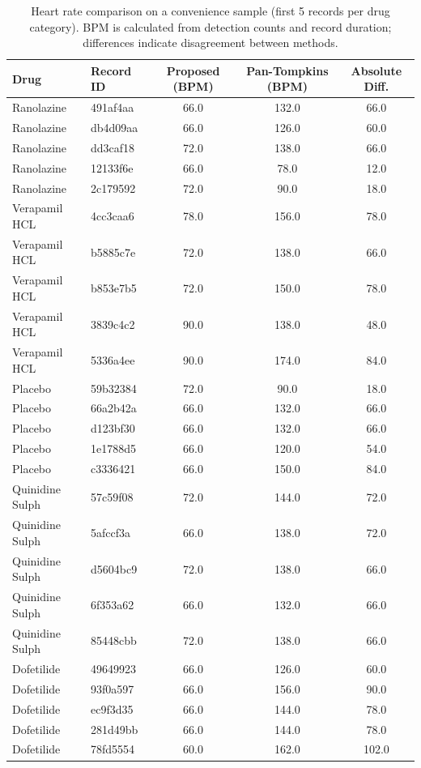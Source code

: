 \documentclass[11pt]{article}
\begin{document}
\begin{table}[htbp]
\centering
\small
\setlength{\tabcolsep}{3pt}
\caption{Heart rate comparison on a convenience sample (first 5 records per drug category). BPM is calculated from detection counts and record duration; differences indicate disagreement between methods.}
\label{tab:benchmark}
    \begin{tabular}{llccc}
        \toprule
        \textbf{Drug} & \textbf{Record ID} & \textbf{Proposed (BPM)} & \textbf{Pan-Tompkins (BPM)} & \textbf{Absolute Diff.} \\
        \midrule
        Ranolazine & 491af4aa & 66.0 & 132.0 & 66.0 \\
        Ranolazine & db4d09aa & 66.0 & 126.0 & 60.0 \\
        Ranolazine & dd3caf18 & 72.0 & 138.0 & 66.0 \\
        Ranolazine & 12133f6e & 66.0 & 78.0 & 12.0 \\
        Ranolazine & 2c179592 & 72.0 & 90.0 & 18.0 \\
        Verapamil HCL & 4cc3caa6 & 78.0 & 156.0 & 78.0 \\
        Verapamil HCL & b5885c7e & 72.0 & 138.0 & 66.0 \\
        Verapamil HCL & b853e7b5 & 72.0 & 150.0 & 78.0 \\
        Verapamil HCL & 3839c4c2 & 90.0 & 138.0 & 48.0 \\
        Verapamil HCL & 5336a4ee & 90.0 & 174.0 & 84.0 \\
        Placebo & 59b32384 & 72.0 & 90.0 & 18.0 \\
        Placebo & 66a2b42a & 66.0 & 132.0 & 66.0 \\
        Placebo & d123bf30 & 66.0 & 132.0 & 66.0 \\
        Placebo & 1e1788d5 & 66.0 & 120.0 & 54.0 \\
        Placebo & c3336421 & 66.0 & 150.0 & 84.0 \\
        Quinidine Sulph & 57c59f08 & 72.0 & 144.0 & 72.0 \\
        Quinidine Sulph & 5afccf3a & 66.0 & 138.0 & 72.0 \\
        Quinidine Sulph & d5604bc9 & 72.0 & 138.0 & 66.0 \\
        Quinidine Sulph & 6f353a62 & 66.0 & 132.0 & 66.0 \\
        Quinidine Sulph & 85448cbb & 72.0 & 138.0 & 66.0 \\
        Dofetilide & 49649923 & 66.0 & 126.0 & 60.0 \\
        Dofetilide & 93f0a597 & 66.0 & 156.0 & 90.0 \\
        Dofetilide & ec9f3d35 & 66.0 & 144.0 & 78.0 \\
        Dofetilide & 281d49bb & 66.0 & 144.0 & 78.0 \\
        Dofetilide & 78fd5554 & 60.0 & 162.0 & 102.0 \\
        \bottomrule
    \end{tabular}
\end{table}
\end{document}
